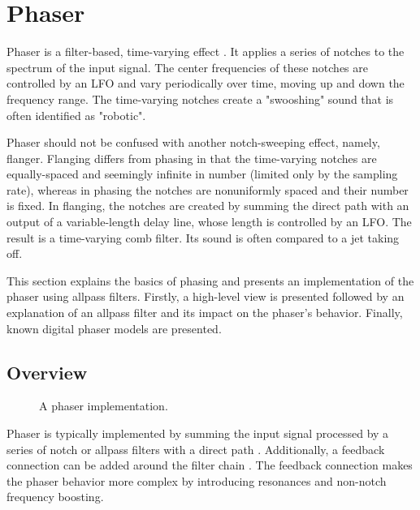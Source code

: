 
\section{Phaser}
\label{chap:phaser}
Phaser is a filter-based, time-varying effect \cite{Zoelzer2011}. It applies a series of notches to the spectrum of the input signal. The center frequencies of these notches are controlled by an \ac{LFO} and vary periodically over time, moving up and down the frequency range. The time-varying notches create a "swooshing" sound that is often identified as "robotic".

Phaser should not be confused with another notch-sweeping effect, namely, flanger. Flanging differs from phasing in that the time-varying notches are equally-spaced and seemingly infinite in number (limited only by the sampling rate), whereas in phasing the notches are nonuniformly spaced and their number is fixed. In flanging, the notches are created by summing the direct path with an output of a variable-length delay line, whose length is controlled by an \ac{LFO}. The result is a time-varying comb filter. Its sound is often compared to a jet taking off.

This section explains the basics of phasing and presents an implementation of the phaser using allpass filters. Firstly, a high-level view is presented followed by an explanation of an allpass filter and its impact on the phaser's behavior. Finally, known digital phaser models are presented.

\subsection{Overview}
\label{sec:phaser_overview}

\begin{figure}
    \centering
    \vspace{2mm}
    
    \caption{A phaser implementation.}
    \label{fig:phaser}
\end{figure}

Phaser is typically implemented by summing the input signal processed by a series of notch or allpass filters with a direct path \cite{Zoelzer2011}. Additionally, a feedback connection can be added around the filter chain \cite{Kiiski2016}. The feedback connection makes the phaser behavior more complex by introducing resonances and non-notch frequency boosting.

